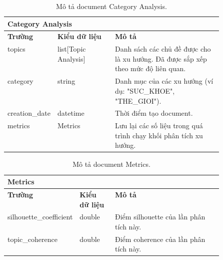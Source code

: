\begin{table}[ht!]
    \centering
\begin{tabular}{|llp{0.5\linewidth}|}
\hline
\multicolumn{3}{|l|}{\textbf{Category Analysis}}                                                                                                                            \\ \hline
\multicolumn{1}{|l|}{\textbf{Trường}} & \multicolumn{1}{l|}{\textbf{Kiểu dữ liệu}}    & \textbf{Mô   tả}                                                                    \\ \hline
\multicolumn{1}{|l|}{topics}          & \multicolumn{1}{l|}{list{[}Topic Analysis{]}} & Danh   sách các chủ đề được cho là xu hướng. Đã được sắp xếp theo mức độ liên quan. \\ \hline
\multicolumn{1}{|l|}{category}        & \multicolumn{1}{l|}{string}                   & Danh   mục của các xu hướng (ví dụ: "SUC\_KHOE", "THE\_GIOI").                      \\ \hline
\multicolumn{1}{|l|}{creation\_date}  & \multicolumn{1}{l|}{datetime}                 & Thời   điểm tạo document.                                                           \\ \hline
\multicolumn{1}{|l|}{metrics}         & \multicolumn{1}{l|}{Metrics}                  & Lưu   lại các số liệu trong quá trình chạy khối phân tích xu hướng.                 \\ \hline
\end{tabular}
    \caption{Mô tả document Category Analysis.}
    \label{table:schema-category-analysis}
\end{table}

\begin{table}[ht!]
    \centering
\begin{tabular}{|llp{0.5\linewidth}|}
\hline
\multicolumn{3}{|l|}{\textbf{Metrics}}                                                                                                \\ \hline
\multicolumn{1}{|l|}{\textbf{Trường}}         & \multicolumn{1}{l|}{\textbf{Kiểu dữ liệu}} & \textbf{Mô   tả}                         \\ \hline
\multicolumn{1}{|l|}{silhouette\_coefficient} & \multicolumn{1}{l|}{double}                & Điểm   silhouette của lần phân tích này. \\ \hline
\multicolumn{1}{|l|}{topic\_coherence}        & \multicolumn{1}{l|}{double}                & Điểm   coherence của lần phân tích này.  \\ \hline
\end{tabular}
    \caption{Mô tả document Metrics.}
    \label{table:schema-metrics}
\end{table}

